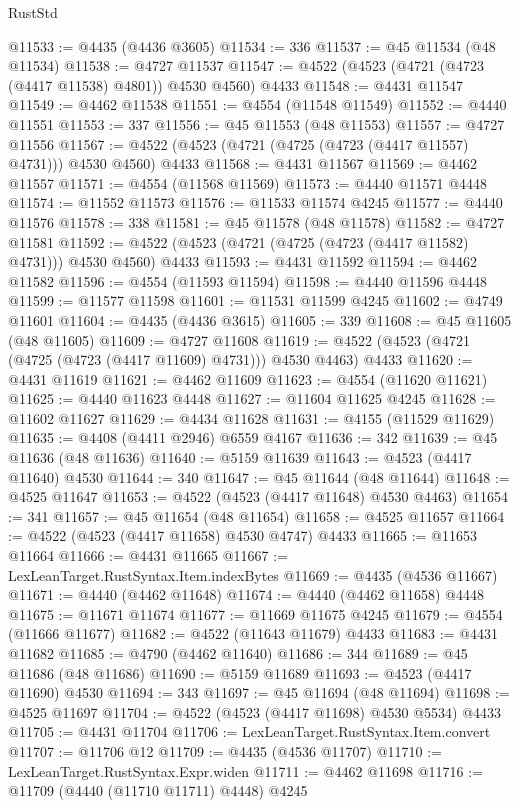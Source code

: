 \begin{lexlean}{RustStd}
\begin{coremodule}
{\begin{coremodule}
{{{{{{{{{{{{{{{{{{{{{{{{{{{{{{{{{{{{{{{{{{{{{{{{{{{{{{{{{{{{@11533 := @4435 (@4436 @3605)
@11534 := 336
@11537 := @45 @11534 (@48 @11534)
@11538 := @4727 @11537
@11547 := @4522 (@4523 (@4721 (@4723 (@4417 @11538) @4801)) @4530 @4560) @4433
@11548 := @4431 @11547
@11549 := @4462 @11538
@11551 := @4554 (@11548 @11549)
@11552 := @4440 @11551
@11553 := 337
@11556 := @45 @11553 (@48 @11553)
@11557 := @4727 @11556
@11567 := @4522 (@4523 (@4721 (@4725 (@4723 (@4417 @11557) @4731))) @4530 @4560) @4433
@11568 := @4431 @11567
@11569 := @4462 @11557
@11571 := @4554 (@11568 @11569)
@11573 := @4440 @11571 @4448
@11574 := @11552 @11573
@11576 := @11533 @11574 @4245
@11577 := @4440 @11576
@11578 := 338
@11581 := @45 @11578 (@48 @11578)
@11582 := @4727 @11581
@11592 := @4522 (@4523 (@4721 (@4725 (@4723 (@4417 @11582) @4731))) @4530 @4560) @4433
@11593 := @4431 @11592
@11594 := @4462 @11582
@11596 := @4554 (@11593 @11594)
@11598 := @4440 @11596 @4448
@11599 := @11577 @11598
@11601 := @11531 @11599 @4245
@11602 := @4749 @11601
@11604 := @4435 (@4436 @3615)
@11605 := 339
@11608 := @45 @11605 (@48 @11605)
@11609 := @4727 @11608
@11619 := @4522 (@4523 (@4721 (@4725 (@4723 (@4417 @11609) @4731))) @4530 @4463) @4433
@11620 := @4431 @11619
@11621 := @4462 @11609
@11623 := @4554 (@11620 @11621)
@11625 := @4440 @11623 @4448
@11627 := @11604 @11625 @4245
@11628 := @11602 @11627
@11629 := @4434 @11628
@11631 := @4155 (@11529 @11629)
@11635 := @4408 (@4411 @2946) @6559 @4167
@11636 := 342
@11639 := @45 @11636 (@48 @11636)
@11640 := @5159 @11639
@11643 := @4523 (@4417 @11640) @4530
@11644 := 340
@11647 := @45 @11644 (@48 @11644)
@11648 := @4525 @11647
@11653 := @4522 (@4523 (@4417 @11648) @4530 @4463)
@11654 := 341
@11657 := @45 @11654 (@48 @11654)
@11658 := @4525 @11657
@11664 := @4522 (@4523 (@4417 @11658) @4530 @4747) @4433
@11665 := @11653 @11664
@11666 := @4431 @11665
@11667 := LexLeanTarget.RustSyntax.Item.indexBytes
@11669 := @4435 (@4536 @11667)
@11671 := @4440 (@4462 @11648)
@11674 := @4440 (@4462 @11658) @4448
@11675 := @11671 @11674
@11677 := @11669 @11675 @4245
@11679 := @4554 (@11666 @11677)
@11682 := @4522 (@11643 @11679) @4433
@11683 := @4431 @11682
@11685 := @4790 (@4462 @11640)
@11686 := 344
@11689 := @45 @11686 (@48 @11686)
@11690 := @5159 @11689
@11693 := @4523 (@4417 @11690) @4530
@11694 := 343
@11697 := @45 @11694 (@48 @11694)
@11698 := @4525 @11697
@11704 := @4522 (@4523 (@4417 @11698) @4530 @5534) @4433
@11705 := @4431 @11704
@11706 := LexLeanTarget.RustSyntax.Item.convert
@11707 := @11706 @12
@11709 := @4435 (@4536 @11707)
@11710 := LexLeanTarget.RustSyntax.Expr.widen
@11711 := @4462 @11698
@11716 := @11709 (@4440 (@11710 @11711) @4448) @4245
}}}}}}}}}}}}}}}}}}}}}}}}}}}}}}}}}}}}}}}}}}}}}}}}}}}}}}}}}}}}
\end{coremodule}}
\end{coremodule}
\end{lexlean}
